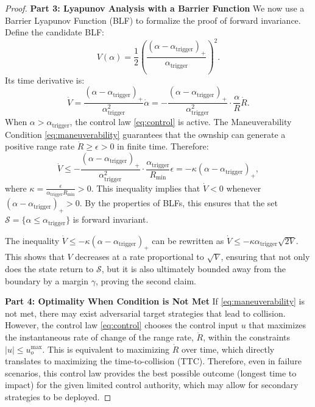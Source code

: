 \documentclass[10pt]{article}
\begin{document}
\begin{proof}
    \textbf{Part 3: Lyapunov Analysis with a Barrier Function}
    We now use a Barrier Lyapunov Function (BLF) to formalize the proof of forward invariance. Define the candidate BLF:
    \[
    V(\alpha) = \frac{1}{2} \left( \frac{(\alpha - \alpha_{\text{trigger}})_+}{\alpha_{\text{trigger}}} \right)^2.
    \]
    Its time derivative is:
    \[
    \dot{V} = \frac{(\alpha - \alpha_{\text{trigger}})_+}{\alpha_{\text{trigger}}^2} \dot{\alpha} = -\frac{(\alpha - \alpha_{\text{trigger}})_+}{\alpha_{\text{trigger}}^2} \cdot \frac{\alpha}{R} \dot{R}.
    \]
    When $\alpha > \alpha_{\text{trigger}}$, the control law \eqref{eq:control} is active. The Maneuverability Condition \eqref{eq:maneuverability} guarantees that the ownship can generate a positive range rate $\dot{R} \geq \epsilon > 0$ in finite time. Therefore:
    $$
    \dot{V} \leq -\frac{(\alpha - \alpha_{\text{trigger}})_+}{\alpha_{\text{trigger}}^2} \cdot \frac{\alpha_{\text{trigger}}}{R_{\text{min}}} \epsilon = -\kappa (\alpha - \alpha_{\text{trigger}})_+,
    $$
    where $\kappa = \frac{\epsilon}{\alpha_{\text{trigger}} R_{\text{min}}} > 0$. This inequality implies that $\dot{V} < 0$ whenever $(\alpha - \alpha_{\text{trigger}})_+ > 0$. By the properties of BLFs, this ensures that the set $\mathcal{S} = \{ \alpha \leq \alpha_{\text{trigger}} \}$ is forward invariant.

    The inequality $\dot{V} \leq -\kappa (\alpha - \alpha_{\text{trigger}})_+$ can be rewritten as $\dot{V} \leq -\kappa \alpha_{\text{trigger}} \sqrt{2V}$. This shows that $V$ decreases at a rate proportional to $\sqrt{V}$, ensuring that not only does the state return to $\mathcal{S}$, but it is also ultimately bounded away from the boundary by a margin $\gamma$, proving the second claim.

    \textbf{Part 4: Optimality When Condition is Not Met}
    If \eqref{eq:maneuverability} is not met, there may exist adversarial target strategies that lead to collision. However, the control law \eqref{eq:control} chooses the control input $u$ that maximizes the instantaneous rate of change of the range rate, $\ddot{R}$, within the constraints $|u| \leq u_o^{\max}$. This is equivalent to maximizing $\dot{R}$ over time, which directly translates to maximizing the time-to-collision (TTC). Therefore, even in failure scenarios, this control law provides the best possible outcome (longest time to impact) for the given limited control authority, which may allow for secondary strategies to be deployed.
\end{proof}
\end{document}
